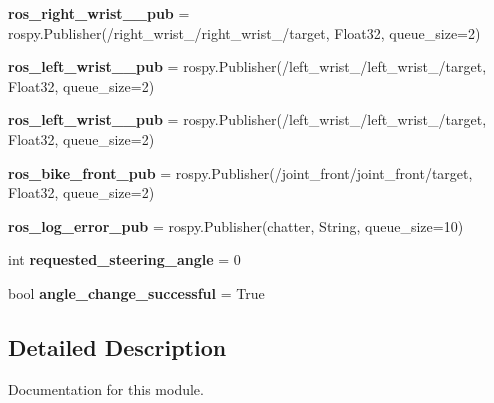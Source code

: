\begin{DoxyCompactItemize}
\item 
\mbox{\label{namespacedoxytest_a3e02d24db3896099c8a900245ef217bd}} 
{\bfseries ros\+\_\+right\+\_\+wrist\+\_\+\_\+pub} = rospy.\+Publisher(\textquotesingle{}/right\+\_\+wrist\+\_/right\+\_\+wrist\+\_/target\textquotesingle{}, Float32, queue\+\_\+size=2)
\item 
\mbox{\label{namespacedoxytest_acef9c076fe1c038f6f4191d1383f2cec}} 
{\bfseries ros\+\_\+left\+\_\+wrist\+\_\+\_\+pub} = rospy.\+Publisher(\textquotesingle{}/left\+\_\+wrist\+\_/left\+\_\+wrist\+\_/target\textquotesingle{}, Float32, queue\+\_\+size=2)
\item 
\mbox{\label{namespacedoxytest_a594ca2405b3e0a3876c972e7f914db8d}} 
{\bfseries ros\+\_\+left\+\_\+wrist\+\_\+\_\+pub} = rospy.\+Publisher(\textquotesingle{}/left\+\_\+wrist\+\_/left\+\_\+wrist\+\_/target\textquotesingle{}, Float32, queue\+\_\+size=2)
\item 
\mbox{\label{namespacedoxytest_a8461e4b8108e7c78278a297910d08940}} 
{\bfseries ros\+\_\+bike\+\_\+front\+\_\+pub} = rospy.\+Publisher(\textquotesingle{}/joint\+\_\+front/joint\+\_\+front/target\textquotesingle{}, Float32, queue\+\_\+size=2)
\item 
\mbox{\label{namespacedoxytest_a8315227b40f874751695ea250b500be4}} 
{\bfseries ros\+\_\+log\+\_\+error\+\_\+pub} = rospy.\+Publisher(\textquotesingle{}chatter\textquotesingle{}, String, queue\+\_\+size=10)
\item 
\mbox{\label{namespacedoxytest_ae50fccd218b69ec910d0a90ddacef292}} 
int {\bfseries requested\+\_\+steering\+\_\+angle} = 0
\item 
\mbox{\label{namespacedoxytest_a2ea9ff54f929c9b74bdbf745ec5072ec}} 
bool {\bfseries angle\+\_\+change\+\_\+successful} = True
\end{DoxyCompactItemize}


\subsection{Detailed Description}
Documentation for this module. 

